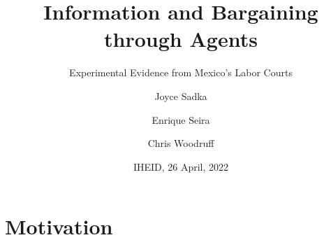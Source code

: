 \documentclass[9pt]{beamer}
\title{Information and Bargaining through Agents}
\subtitle{Experimental Evidence from Mexico's Labor Courts}
\author{Joyce Sadka\inst{1} \and Enrique Seira\inst{2} \and Chris Woodruff\inst{3}}
\institute[ITAM, Oxford] %
{
  \inst{1,2}%
  Instituto Tecnologico Autonomo de Mexico
  \and
  \inst{3}%
  Oxford University
}
\date{IHEID, 26 April, 2022}
\begin{document}
\begin{frame}
  \titlepage
\end{frame}


%    
%      

\section{Motivation}
\end{document}
